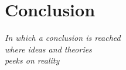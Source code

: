 \chapter{Conclusion}\label{ch:conc}

\begin{flushright}{\slshape
    In which a conclusion is reached\\
    where ideas and theories\\
    peeks on reality
}
\end{flushright}
